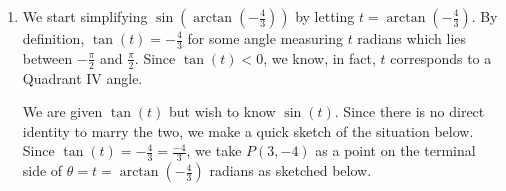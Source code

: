 \documentclass{ximera}
\begin{document}
\begin{example}
\begin{explanation}
\begin{enumerate}
\begin{enumerate}
 

Letting $t = \text{arccot}(-5)$,  by definition, $\cot(t)=-5$.  Hence, $\cot(\text{arccot}(-5)) = \cot(t)=-5$.

\item   We start simplifying  $\sin\left(\arctan\left(-\frac{4}{3}\right)\right)$ by letting $t = \arctan\left(-\frac{4}{3}\right)$.  By definition,  $\tan(t) = -\frac{4}{3}$ for some angle measuring $t$ radians which lies between $-\frac{\pi}{2}$ and $\frac{\pi}{2}$.   Since $\tan(t) < 0$, we know, in fact, $t$ corresponds to a Quadrant IV angle.  

 

We are given $\tan(t)$ but wish to know $\sin(t)$.  Since there is no direct identity to marry the two, we make a quick sketch of the situation below.  Since $\tan(t) = -\frac{4}{3} = \frac{-4}{3}$, we take $P(3,-4)$ as a point on the terminal side of $\theta = t =  \arctan\left(-\frac{4}{3}\right)$ radians as sketched below.



\begin{image}
\end{image}
\end{enumerate}
\end{enumerate}
\end{explanation}
\end{example}
\end{document}
